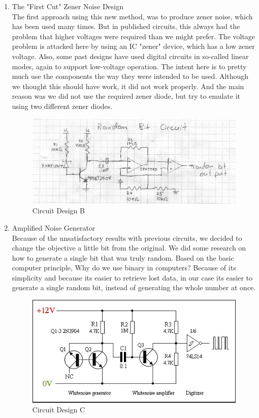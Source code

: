 \documentclass[twocolumn]{IEEEtran}
\begin{document}
\begin{enumerate}
    \item The "First Cut" Zener Noise Design\\
    
    The first approach using this new method, was to produce zener noise, which has been used many times. But in published circuits, this always had the problem that higher voltages were required than we might prefer. The voltage problem is attacked here by using an IC "zener" device, which has a low zener voltage. Also, some past designs have used digital circuits in so-called linear modes, again to support low-voltage operation. The intent here is to pretty much use the components the way they were intended to be used. Although we thought this should have work, it did not work properly. And the main reason was we did not use the required zener diode, but try to emulate it using two different zener diodes.
    
    \begin{figure}[h!]
	\centering
	\includegraphics[width=\columnwidth]{src/Rand_V2.jpg}
	\caption{Circuit Design B}
	\end{figure}
    
    \item Amplified Noise Generator\\
    
    Because of the unsatisfactory results with previous circuits, we decided to change the objective a little bit from the original. We did some research on how to generate a single bit that was truly random. Based on the basic computer principle, Why do we use binary in computers? Because of its simplicity and because its easier to retrieve lost data, in our case its easier to generate a single random bit, instead of generating the whole number at once.
    
    \begin{figure}[h!]
	\centering
	\includegraphics[width=\columnwidth]{src/Rand_V3.jpg}
	\caption{Circuit Design C}
	\end{figure}
    

\end{enumerate}
\end{document}
